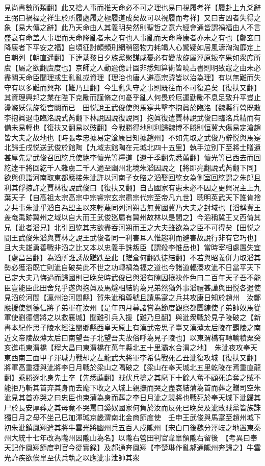 見尚書數所類翻】此又捨人事而推天命必不可之理也易曰視履考祥【履卦上九爻辭王弼曰禍福之祥生於所履處履之極履道成矣故可以視履而考祥】又曰吉凶者失得之象【易大傳之辭】此乃天命由人其義明矣然則聖哲之意六經會通皆謂禍福由人不言盛衰有命盖人事理而天命降亂者未之有也人事亂而天命降康者亦未之有也【鄭玄曰降康者下平安之福】自頃征討頗頻刑網稍密物力耗竭人心驚疑如居風濤洶洶靡定上自朝列【朝直遥翻】下逹蒸黎日夕族黨聚謀咸憂必有變故旋屬涇原叛卒果如衆庶所虞【屬之欲翻虞度也】京師之人動逾億計固非悉知算術皆曉占書則明致寇之由未必盡關天命臣聞理或生亂亂或資理【理治也唐人避高宗諱皆以治為理】有以無難而失守有以多難而興邦【難乃旦翻】今生亂失守之事則既往而不可復追矣【復扶又翻】其資理興邦之業在陛下克勵而謹脩之何憂乎亂人何畏於厄運勤勵不息足致升平豈止盪滌妖氛旋復宫闕而已　田悦說王武俊使與馬寔共擊李抱眞於臨洺【魏縣行營既散李抱眞退屯臨洺說式芮翻下林說因說復說同】抱眞復遣賈林說武俊曰臨洺兵精而有備未易輕也【復扶又翻易以豉翻】今戰勝得地則利歸魏博不勝則恒冀大傷易定滄趙皆大夫之故地也【時張孝忠據易定滄康日知據趙州】不如先取之武俊乃辭悦與馬寔北歸壬戌悦送武俊於館陶【九域志館陶在元城北四十五里】執手泣别下至將士贈遺甚厚先是武俊召回紇兵使絶李懷光等糧道【遺于季翻先悉薦翻】懷光等已西去而回紇逹干將回紇千人雜虜二千人適至幽州北境朱滔因說之【將即亮翻說式芮翻下同】欲與俱詣河南取東都應接朱泚許以河南子女賂之滔娶回紇女為側室回紇謂之朱郎且利其俘掠許之賈林復說武俊曰【復扶又翻】自古國家有患未必不因之更興况主上九葉天子【自高祖太宗高宗中宗睿宗玄宗肅宗代宗至帝凡九世】聰明英武天下誰肯捨之共事朱泚乎滔自為盟主以來輕蔑同列河朔古無冀國冀乃大夫之封域也【滔稱冀王盖奄禹跡冀州之域以自大而王武俊廵屬有冀州故林以是間之】今滔稱冀王又西倚其兄【泚者滔兄】北引回紇其志欲盡吞河朔而王之大夫雖欲為之臣不可得矣【田悦之間王武俊朱滔與賈林之說王武俊者同一利害耳人惟趨利而避害故說行非有它巧也】且大夫雄勇善戰非滔之比又本以忠義手誅叛臣【謂殺李惟岳也】當時宰相處置失宜【處昌呂翻】為滔所誑誘故蹉跌至此【蹉倉何翻跌徒結翻】不若與昭義併力取滔其勢必獲滔既亡則泚自破矣此不世之功轉禍為福之道也今諸道輻湊攻泚不日當平天下已定大夫乃悔過而歸國則已晩矣時武俊已與滔有隙因攘袂作色曰二百年天子吾不能臣豈能臣此田舍兒乎遂與抱眞及馬燧相結約為兄弟然猶外事滔禮甚謹與田悦各遣使見滔於河間【瀛州治河間縣】賀朱泚稱尊號且請馬寔之兵共攻康日知於趙州　汝鄭應援使劉德信將子弟軍在汝州【是年四月募諸嘗為節度觀察都團練使子弟帥奴馬從軍使劉德信將之以救襄城】聞難引兵入援【難乃旦翻】與泚衆戰於見子陵破之【新書本紀作思子陵水經注閺鄉縣西皇天原上有漢武帝思子臺又漢薄太后陵在覇陵之南近文帝陵故薄太后曰南望吾子北望吾夫故俗呼為見子陵也】以東渭橋有轉輸積粟癸亥進屯東渭橋【程大昌曰東渭橋在萬年縣北五十里灞水合渭之地】　朱泚夜攻奉天東西南三面甲子渾瑊力戰却之左龍武大將軍李希倩戰死乙丑泚復攻城【復扶又翻】將軍高重捷與泚將李日月戰於梁山之隅破之【梁山在奉天城北五里乾陵在焉重直龍翻】乘勝逐北身先士卒【先悉薦翻】賊伏兵擒之其麾下十餘人奮不顧死追奪之賊不能拒乃斬其首弃其身而去麾下收之入城上親撫而哭之盡哀結蒲為首而葬之贈司空朱泚見其首亦哭之曰忠臣也束蒲為身而葬之李日月泚之驍將也戰死於奉天城下泚歸其尸於長安厚葬之其母竟不哭罵曰奚奴國家何負於汝而反死已晩矣及泚敗賊黨皆族誅獨日月之母不坐己巳加渾瑊京畿渭南北金商節度使　壬申王武俊與馬寔至趙州城下　初朱泚鎮鳳翔遣其將牛雲光將幽州兵五百人戍隴州【宋白曰後魏分涇岐之地置東秦州大統十七年改為隴州因隴山為名】以隴右營田判官韋臯領隴右留後　【考異曰奉天記作鳳翔節度判官今從實録】及郝通奔鳳翔【李楚琳作亂郝通隴州奔歸之】牛雲光詐疾欲俟臯至伏兵執之以應泚事泄帥其衆